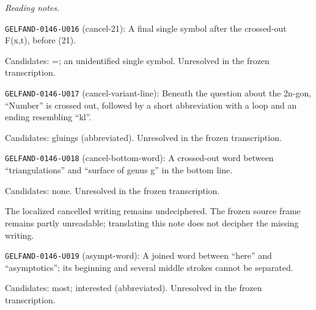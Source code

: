 \par\smallskip\noindent\textit{Reading notes.}\par
\noindent\texttt{GELFAND-0146-U016} (cancel-21): A final single symbol after the crossed-out F(x,t), before (21).\par
Candidates: =; an unidentified single symbol. Unresolved in the frozen transcription.\par
\noindent\texttt{GELFAND-0146-U017} (cancel-variant-line): Beneath the question about the 2n-gon, “Number” is crossed out, followed by a short abbreviation with a loop and an ending resembling “kl”.\par
Candidates: gluings (abbreviated). Unresolved in the frozen transcription.\par
\noindent\texttt{GELFAND-0146-U018} (cancel-bottom-word): A crossed-out word between “triangulations” and “surface of genus g” in the bottom line.\par
Candidates: none. Unresolved in the frozen transcription.\par
The localized cancelled writing remains undeciphered. The frozen source frame remains partly unreadable; translating this note does not decipher the missing writing.\par
\noindent\texttt{GELFAND-0146-U019} (asympt-word): A joined word between “here” and “asymptotics”; its beginning and several middle strokes cannot be separated.\par
Candidates: most; interested (abbreviated). Unresolved in the frozen transcription.\par


